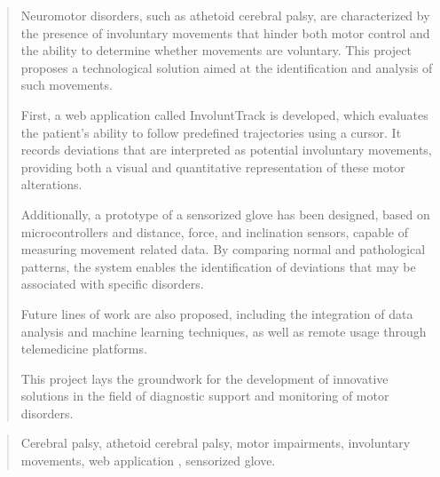 \documentclass[a4paper,12pt,twoside]{memoir}
\begin{document}
\renewcommand*\abstractname{Abstract}
\begin{abstract}
Neuromotor disorders, such as athetoid cerebral palsy, are characterized by the presence of involuntary movements that hinder both motor control and the ability to determine whether movements are voluntary. This project proposes a technological solution aimed at the identification and analysis of such movements. 

First, a web application called InvoluntTrack is developed, which evaluates the patient’s ability to follow predefined trajectories using a cursor. It records deviations that are interpreted as potential involuntary movements, providing both a visual and quantitative representation of these motor alterations. 

Additionally, a prototype of a sensorized glove has been designed, based on microcontrollers and distance, force, and inclination sensors, capable of measuring movement related data. By comparing normal and pathological patterns, the system enables the identification of deviations that may be associated with specific disorders. 

Future lines of work are also proposed, including the integration of data analysis and machine learning techniques, as well as remote usage through telemedicine platforms. 

This project lays the groundwork for the development of innovative solutions in the field of diagnostic support and monitoring of motor disorders. 

\end{abstract}

\renewcommand*\abstractname{Keywords}
\begin{abstract}
Cerebral palsy, athetoid cerebral palsy, motor impairments, involuntary movements, web application , sensorized glove. 
\end{abstract}

\clearpage

\tableofcontents

\clearpage

\listoffigures

\clearpage

\listoftables
\clearpage


\mainmatter












\end{document}

